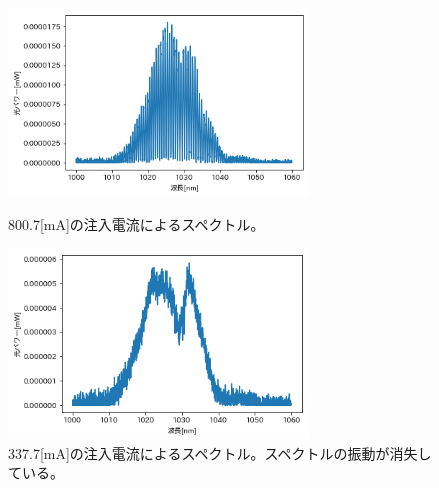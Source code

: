 \documentclass[titlepage]{jsarticle}
\begin{document}
\begin{figure}[htbp]
 \begin{minipage}{0.5\hsize}
  \begin{center}
   \includegraphics[width=80mm]{469_2[mA].png}
  \end{center}
  \caption{800.7[mA]の注入電流によるスペクトル。}
  \label{fig:469_2}
 \end{minipage}
 \begin{minipage}{0.5\hsize}
  \begin{center}
   \includegraphics[width=80mm]{337_7[mA].png}
  \end{center}
  \caption{337.7[mA]の注入電流によるスペクトル。スペクトルの振動が消失している。}
  \label{fig:337_7}
 \end{minipage}
\end{figure}
\end{document}
